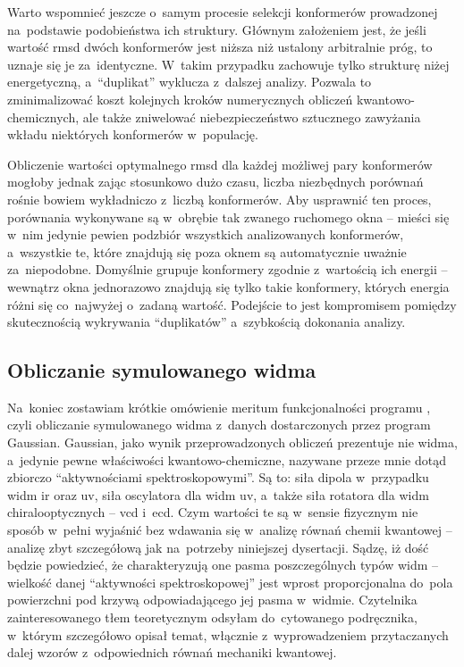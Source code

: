 Warto wspomnieć jeszcze o~samym procesie selekcji konformerów prowadzonej na~podstawie
  podobieństwa ich struktury.
Głównym założeniem jest, że jeśli wartość \gls{rmsd} dwóch konformerów jest niższa niż
  ustalony arbitralnie próg, to uznaje się je za~identyczne.
W~takim przypadku \tesliper{} zachowuje tylko strukturę niżej energetyczną, a~\enquote{duplikat}
  wyklucza z~dalszej analizy.
Pozwala to zminimalizować koszt kolejnych kroków numerycznych obliczeń kwantowo-chemicznych,
  ale także zniwelować niebezpieczeństwo sztucznego zawyżania
  wkładu niektórych konformerów w~populację.

Obliczenie wartości optymalnego \gls{rmsd} dla każdej możliwej pary konformerów mogłoby
  jednak zając stosunkowo dużo czasu, liczba niezbędnych porównań rośnie bowiem
  wykładniczo z~liczbą konformerów.
Aby usprawnić ten proces, porównania wykonywane są w~obrębie tak zwanego ruchomego okna \---
  mieści się w~nim jedynie pewien podzbiór wszystkich analizowanych konformerów,
  a~wszystkie te, które znajdują się poza oknem są automatycznie uważnie za~niepodobne.
Domyślnie \tesliper{} grupuje konformery zgodnie z~wartością ich energii \--- wewnątrz
  okna jednorazowo znajdują się tylko takie konformery, których energia różni się
  co~najwyżej o~zadaną wartość.
Podejście to jest kompromisem pomiędzy skutecznością wykrywania \enquote{duplikatów}
  a~szybkością dokonania analizy.

\subsection{Obliczanie symulowanego widma}\label{implementation:spectra}
Na~koniec zostawiam krótkie omówienie meritum funkcjonalności programu \tesliper{},
  czyli obliczanie symulowanego widma z~danych dostarczonych przez program Gaussian.
Gaussian, jako wynik przeprowadzonych obliczeń prezentuje nie widma, a~jedynie pewne właściwości
  kwantowo-chemiczne, nazywane przeze mnie dotąd zbiorczo \enquote{aktywnościami spektroskopowymi}.
Są to: siła dipola w~przypadku widm \gls{ir} oraz \gls{uv}, siła oscylatora dla widm \gls{uv},
  a~także siła rotatora dla widm chiralooptycznych \--- \gls{vcd} i~\gls{ecd}.
Czym wartości te są w~sensie fizycznym nie sposób w~pełni wyjaśnić bez wdawania się w~analizę
  równań chemii kwantowej \--- analizę zbyt szczegółową jak na~potrzeby niniejszej dysertacji.
Sądzę, iż dość będzie powiedzieć, że charakteryzują one pasma poszczególnych typów widm \---
  wielkość danej \enquote{aktywności spektroskopowej} jest wprost proporcjonalna do~pola
  powierzchni pod krzywą odpowiadającego jej pasma w~widmie.
Czytelnika zainteresowanego tłem teoretycznym odsyłam do~cytowanego podręcznika,
  w~którym \citeauthor{polavarapu17} szczegółowo opisał temat, włącznie z~wyprowadzeniem
  przytaczanych dalej wzorów z~odpowiednich równań mechaniki kwantowej.

